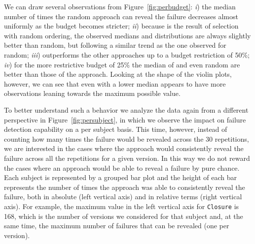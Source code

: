 We can draw several observations from Figure~\ref{fig:perbudget}:
\textit{i}) the median number of times the random approach can reveal the failure decreases almost uniformly as the budget becomes  stricter;
\textit{ii}) because \ekr is the result of \ek selection with random ordering, the observed medians and distributions 
are always slightly better than random, but following a similar trend as the one observed for random;
\textit{iii}) \fz outperforms the other approaches up to a budget restriction of 50\%;
\textit{iv}) for the more restrictive budget of 25\% the median of \ekr and even random are better than those of the \fz approach.
Looking at the shape of the violin plots, however, we can see that even with a lower median  \fz  appears to have more observations leaning towards the maximum possible value.


To better understand such a behavior we analyze the data again from a different perspective in Figure~\ref{fig:persubject}, in which 
we observe the impact on failure detection capability on a per subject basis.
This time, however, instead of counting how many times the failure would be revealed across the 30 repetitions,
we are interested in the cases where the approach would consistently reveal the failure across all the repetitions for a given version.
In this way we do not reward the cases where an approach would be able to reveal a failure by pure chance. 
Each subject is represented by a grouped bar plot and the height of each bar
represents the number of times the approach was able to consistently reveal the failure, 
both in absolute (left vertical axis) and in relative terms (right vertical axis).
For example, the maximum value in the left vertical axis for \texttt{Closure} is 168, 
which is the number of versions we considered for that subject and, at the same time, the maximum number of failures that can be revealed (one per version).


